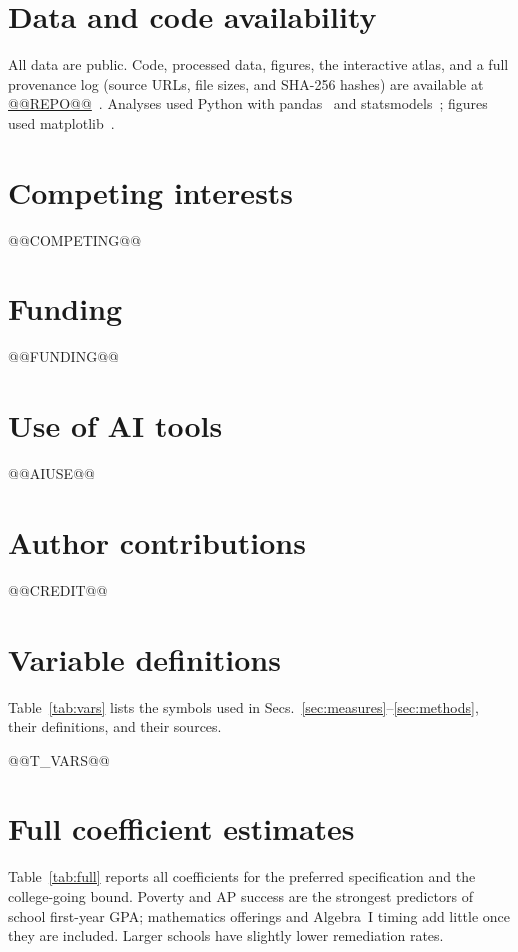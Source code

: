 \documentclass[aps,prd,reprint,superscriptaddress,nofootinbib,floatfix]{revtex4-2}
\begin{document}
\section*{Data and code availability}
All data are public. Code, processed data, figures, the interactive atlas, and a full provenance log (source URLs, file sizes, and SHA-256 hashes) are available at \url{@@REPO@@}~\cite{repo}. Analyses used Python with pandas~\cite{mckinney2010} and statsmodels~\cite{seabold2010}; figures used matplotlib~\cite{hunter2007}.

\section*{Competing interests}
@@COMPETING@@

\section*{Funding}
@@FUNDING@@

\section*{Use of AI tools}
@@AIUSE@@

\section*{Author contributions}
@@CREDIT@@

\appendix

\section{Variable definitions}\label{app:vars}

Table~\ref{tab:vars} lists the symbols used in Secs.~\ref{sec:measures}--\ref{sec:methods}, their definitions, and their sources.

@@T_VARS@@

\section{Full coefficient estimates}\label{app:full}

Table~\ref{tab:full} reports all coefficients for the preferred specification and the college-going bound. Poverty and AP success are the strongest predictors of school first-year GPA; mathematics offerings and Algebra~I timing add little once they are included. Larger schools have slightly lower remediation rates.
\end{document}
